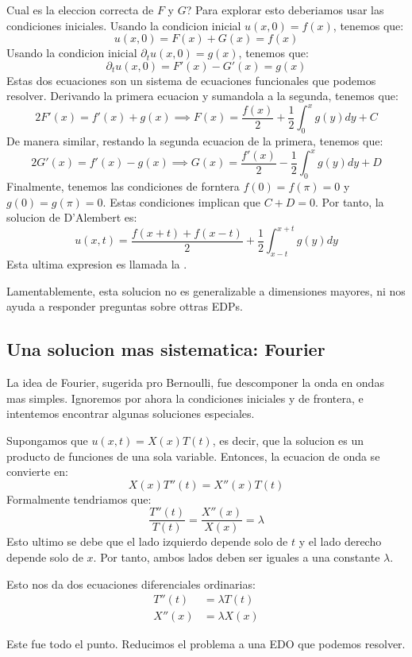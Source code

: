Cual es la eleccion correcta de $F$ y $G$? Para explorar esto deberiamos usar las condiciones iniciales. 
Usando la condicion inicial $u(x,0) = f(x)$, tenemos que:
\[
   u(x,0) = F(x) + G(x) = f(x)
\]
Usando la condicion inicial $\partial_t u(x,0) = g(x)$, tenemos que:
\[
   \partial_t u(x,0) = F'(x) - G'(x) = g(x)
\]
Estas dos ecuaciones son un sistema de ecuaciones funcionales que podemos resolver. Derivando la primera ecuacion y sumandola a la segunda, tenemos que:
\[
   2F'(x) = f'(x) + g(x) \implies F(x) = \frac{f(x)}{2} + \frac{1}{2}\int_0^x g(y) dy + C
\]
De manera similar, restando la segunda ecuacion de la primera, tenemos que:
\[
   2G'(x) = f'(x) - g(x) \implies G(x) = \frac{f'(x)}{2} - \frac{1}{2}\int_0^x g(y) dy + D
\]
Finalmente, tenemos las condiciones de forntera $f(0)=f(\pi)=0$ y $g(0)=g(\pi)=0$. Estas condiciones implican que $C+D=0$. Por tanto, la solucion de D'Alembert es:
\[
   u(x,t) = \frac{f(x+t) + f(x-t)}{2} + \frac{1}{2}\int_{x-t}^{x+t} g(y) dy
\]
Esta ultima expresion es llamada la .

Lamentablemente, esta solucion no es generalizable a dimensiones mayores, ni nos ayuda a responder preguntas sobre ottras EDPs. 

\subsection{Una solucion mas sistematica: Fourier}

La idea de Fourier, sugerida pro Bernoulli, fue descomponer la onda en ondas mas simples. Ignoremos por ahora la condiciones iniciales y de frontera, e intentemos encontrar algunas soluciones especiales.

Supongamos que $u(x,t) = X(x)T(t)$, es decir, que la solucion es un producto de funciones de una sola variable. Entonces, la ecuacion de onda se convierte en:
\[
   X(x)T''(t) = X''(x)T(t)
\]
Formalmente tendriamos que:
\[
   \frac{T''(t)}{T(t)} = \frac{X''(x)}{X(x)} = \lambda
\]
Esto ultimo se debe que el lado izquierdo depende solo de $t$ y el lado derecho depende solo de $x$. Por tanto, ambos lados deben ser iguales a una constante $\lambda$.

Esto nos da dos ecuaciones diferenciales ordinarias:
\begin{align*}
   T''(t) &= \lambda T(t) \\
   X''(x) &= \lambda X(x)
\end{align*}

Este fue todo el punto. Reducimos el problema a una EDO que podemos resolver.
